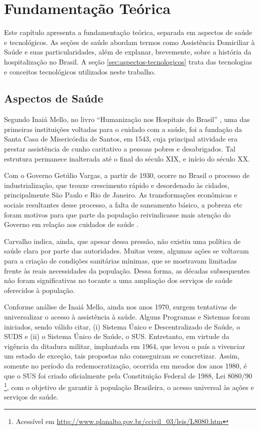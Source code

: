\chapter{Fundamentação Teórica}\label{cap:fundamentacao-teorica}

Este capítulo apresenta a fundamentação teórica, separada em aspectos de saúde e
tecnológicos. As seções de saúde abordam termos como Assistência Domiciliar à
Saúde e suas particularidades, além de explanar, brevemente, sobre a história da
hospitalização no Brasil. A seção \ref{sec:aspectos-tecnologicos} trata das
tecnologias e conceitos tecnológicos utilizados neste trabalho.

\section{Aspectos de Saúde}\label{sec:aspectos-de-saude}

Segundo Inaiá Mello, no livro ``Humanização nos Hospitais do Brasil''
\cite{inaia2008}, uma das primeiras instituições voltadas para o cuidado com a
saúde, foi a fundação da Santa Casa de Misericórdia de Santos, em 1543, cuja
principal atividade era prestar assistência de cunho caritativo a pessoas pobres
e desabrigados. Tal estrutura permanece inalterada até o final do século XIX,
e início do século XX.

Com o Governo Getúlio Vargas, a partir de 1930, ocorre no Brasil o processo de
industrialização, que trouxe crescimento rápido e desordenado às cidades,
principalmente São Paulo e Rio de Janeiro. As transformações econômicas e
sociais resultantes desse processo, a falta de saneamento básico, a pobreza etc
foram motivos para que parte da população reivindicasse mais atenção do Governo
em relação aos cuidados de saúde \cite{carvalho1984}.

Carvalho indica, ainda, que apesar dessa pressão, não existiu uma política de
saúde clara por parte das autoridades. Muitas vezes, algumas ações se voltavam
para a criação de condições sanitárias mínimas, que se mostravam limitadas
frente às reais necessidades da população. Dessa forma, as décadas subsequentes
não foram significativas no tocante a uma ampliação dos serviços de saúde
oferecidos à população.

Conforme análise de Inaiá Mello, ainda nos anos 1970, surgem tentativas de
universalizar o acesso à assistência à saúde. Alguns Programas e Sistemas foram
iniciados, sendo válido citar, (i) Sistema Único e Descentralizado de Saúde, o
SUDS e (ii) o Sistema Único de Saúde, o SUS. Entretanto, em virtude da vigência
da ditadura militar, implantada em 1964, que levou o país a vivenciar um estado
de exceção, tais propostas não conseguiram se concretizar. Assim, somente no
período da redemocratização, ocorrida em meados dos anos 1980, é que o SUS foi
criado oficialmente pela Constituição Federal de 1988, Lei 8080/90
\footnote{Acessível em
\url{http://www.planalto.gov.br/ccivil_03/leis/L8080.htm}}, com o objetivo de
garantir à população Brasileira, o acesso universal às ações e serviços de
saúde.

